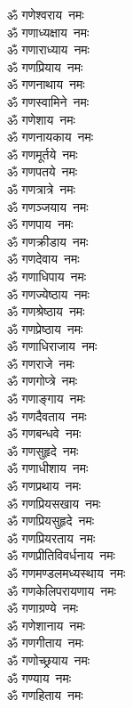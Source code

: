 \begin{multicols}{2}
\begin{flushleft}
ॐ गणेश्वराय~नमः\\
ॐ गणाध्यक्षाय~नमः\\
ॐ गणाराध्याय~नमः\\
ॐ गणप्रियाय~नमः\\
ॐ गणनाथाय~नमः\\
ॐ गणस्वामिने~नमः\\
ॐ गणेशाय~नमः\\
ॐ गणनायकाय~नमः\\
ॐ गणमूर्तये~नमः\\
ॐ गणपतये~नमः\hfill{}\\
ॐ गणत्रात्रे~नमः\\
ॐ गणञ्जयाय~नमः\\
ॐ गणपाय~नमः\\
ॐ गणक्रीडाय~नमः\\
ॐ गणदेवाय~नमः\\
ॐ गणाधिपाय~नमः\\
ॐ गणज्येष्ठाय~नमः\\
ॐ गणश्रेष्ठाय~नमः\\
ॐ गणप्रेष्ठाय~नमः\\
ॐ गणाधिराजाय~नमः\hfill{}\\
ॐ गणराजे~नमः\\
ॐ गणगोप्त्रे~नमः\\
ॐ गणाङ्गाय~नमः\\
ॐ गणदैवताय~नमः\\
ॐ गणबन्धवे~नमः\\
ॐ गणसुहृदे~नमः\\
ॐ गणाधीशाय~नमः\\
ॐ गणप्रथाय~नमः\\
ॐ गणप्रियसखाय~नमः\\
ॐ गणप्रियसुहृदे~नमः\hfill{}\\
ॐ गणप्रियरताय~नमः\\
ॐ गणप्रीतिविवर्धनाय~नमः\\
ॐ गणमण्डलमध्यस्थाय~नमः\\
ॐ गणकेलिपरायणाय~नमः\\
ॐ गणाग्रण्ये~नमः\\
ॐ गणेशानाय~नमः\\
ॐ गणगीताय~नमः\\
ॐ गणोच्छ्रयाय~नमः\\
ॐ गण्याय~नमः\\
ॐ गणहिताय~नमः\hfill{}\\

\end{flushleft}
\end{multicols}
